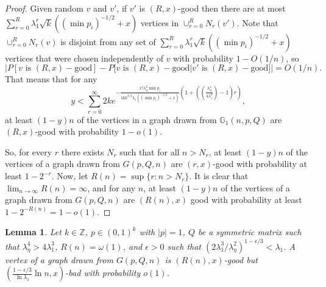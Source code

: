 \documentclass[11pt]{article}
\newcommand{\gss}{\mathbb{G}_1}
\newcommand{\1}{\mathbb{1}}
\newtheorem{lemma}{Lemma}
\begin{document}
\begin{proof}
Given random $v$ and $v'$, if $v'$ is $(R,x)$-good then there are at most $\sum_{r=0}^R \lambda_1^r\sqrt{k}((\min p_i)^{-1/2}+x)$ vertices in $\cup_{r=0}^R N_r(v')$. Note that $\cup_{r=0}^R N_r(v)$ is disjoint from any set of $\sum_{r=0}^R \lambda_1^r\sqrt{k}((\min p_i)^{-1/2}+x)$ vertices that were chosen independently of $v$ with probability $1-O(1/n)$, so \[|P[v \text{ is } (R,x)-\text{good}]-P[v \text{ is } (R,x)-\text{good}|v' \text{ is } (R,x)-\text{good}]|=O(1/n).\] That means that for any $$y<\sum_{r=0}^\infty 2ke^{-\frac{x^2\lambda_{\eta}^2\min p_i}{16k^{3/2}\lambda_1((\min p_i)^{-1/2}+x)}\left(1+\left(\left(\frac{\lambda_{\eta}^4}{4\lambda_1^3}\right)-1\right)r\right)},$$ at least $(1-y)n$ of the vertices in a graph drawn from $\gss(n,p,Q)$ are $(R,x)$-good with probability $1-o(1)$.

So, for every $r$ there exists $N_r$ such that for all $n>N_r$, at least $(1-y)n$ of the vertices of a graph drawn from $G(p, Q, n)$ are $(r,x)$-good with probability at least $1-2^{-r}$. Now, let $R(n)=\sup \{r: n>N_r\}$. It is clear that $\lim_{n\to\infty} R(n)=\infty$, and for any $n$, at least $(1-y)n$ of the vertices of a graph drawn from $G(p, Q, n)$ are $(R(n),x)$ good with probability at least $1-2^{-R(n)}=1-o(1)$.
\end{proof}

\begin{lemma}
Let $k\in \mathbb{Z}$, $p\in (0,1)^k$ with $|p|=1$, $Q$ be a symmetric matrix such that $\lambda_{\eta}^4>4\lambda_1^3$, $R(n)=\omega(1)$, and $\epsilon>0$ such that $(2\lambda_1^3/\lambda_{\eta}^2)^{1-\epsilon/3}<\lambda_1$. A vertex of a graph drawn from $G(p, Q, n)$ is $(R(n),x)$-good but $(\frac{1-\epsilon/3}{\ln\lambda_1}\ln n,x)$-bad with probability $o(1)$.
\end{lemma}
\end{document}
